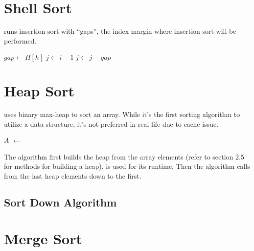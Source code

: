 \documentclass{report}
\begin{document}
\section{Shell Sort}

 runs insertion sort with ``gaps'', the index margin where insertion sort will be performed.

\noindent \hrulefill
\begin{algorithmic}[1]
   
      \State $gap \gets H[h]$
        \State $j \gets i - 1$
            \State {}
            \State $j \gets j - gap$
          \EndIf
        \EndWhile
      \EndFor
    \EndFor
    \State {}
  \EndFunction
\end{algorithmic}
\noindent \hrulefill

\section{Heap Sort}

 uses binary max-heap to sort an array. While it's the first sorting algorithm to utilize a data structure, it's not preferred in real life due to cache issue.

\noindent \hrulefill
\begin{algorithmic}[1]
   
    \State $A$ $\gets$ 
      \State {}
    \EndFor
    \State {}
  \EndFunction
\end{algorithmic}
\noindent \hrulefill

The algorithm first builds the heap from the array elements (refer to section 2.5 for methods for building a heap).  is used for its runtime. Then the algorithm calls  from the last heap elements down to the first.

\subsection{Sort Down Algorithm}

\section{Merge Sort}
\end{document}
